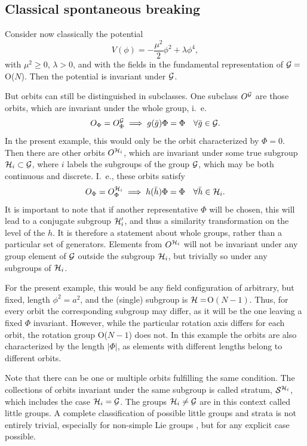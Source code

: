 \documentclass[final,twoside,12pt]{article}
\newcommand*{\no}{\noindent}
\newcommand*{\be}{\begin{equation}}
\newcommand*{\ee}{\end{equation}}
\newcommand*{\nn}{\nonumber}
\newcommand*{\1}{1\!\!\!\bot}
\begin{document}
\subsection{Classical spontaneous breaking}\label{ss:cssb}

Consider now classically the potential
\be
V(\phi)=-\frac{\mu^2}{2}\phi^2+\lambda\phi^4\label{esb:pot},
\ee
\no with $\mu^2\ge0$, $\lambda>0$, and with the fields in the fundamental representation of ${\cal G}=$O($N$). Then the potential is invariant under ${\cal G}$.

But orbits can still be distinguished in subclasses. One subclass $O^{\cal G}$ are those orbits, which are invariant under the whole group, i.\ e.\
\be
O_\Phi=O_\Phi^{\cal G}\implies g(\bar{g})\Phi=\Phi\quad\forall \bar{g}\in{\cal G}\nn.
\ee
\no In the present example, this would only be the orbit characterized by $\Phi=0$. Then there are other orbits $O^{{\cal H}_i}$, which are invariant under some true subgroup ${\cal H}_i\subset{\cal G}$, where $i$ labels the subgroups of the group ${\cal G}$, which may be both continuous and discrete. I.\ e., these orbits satisfy
\be
O_\Phi=O_\Phi^{{\cal H}_i}\implies h(\bar{h})\Phi=\Phi\quad\forall \bar{h}\in{\cal H}_i\nn.
\ee
\no  It is important to note that if another representative $\Phi$ will be chosen, this will lead to a conjugate subgroup ${\cal H}_i'$, and thus a similarity transformation on the level of the $h$. It is therefore a statement about whole groups, rather than a particular set of generators. Elements from $O^{{\cal H}_i}$ will not be invariant under any group element of ${\cal G}$ outside the subgroup ${\cal H}_i$, but trivially so under any subgroups of ${\cal H}_i$.

For the present example, this would be any field configuration of arbitrary, but fixed, length $\phi^2=a^2$, and the (single) subgroup is ${\cal H}=$O$(N-1)$. Thus, for every orbit the corresponding subgroup may differ, as it will be the one leaving a fixed $\Phi$ invariant. However, while the particular rotation axis differs for each orbit, the rotation group O($N-1$) does not. In this example the orbits are also characterized by the length $|\Phi|$, as elements with different lengths belong to different orbits.

Note that there can be one or multiple orbits fulfilling the same condition. The collections of orbits invariant under the same subgroup is called stratum, ${\cal S}^{{\cal H}_i}$, which includes the case ${\cal H}_i={\cal G}$. The groups ${\cal H}_i\neq{\cal G}$ are in this context called little groups. A complete classification of possible little groups and strata is not entirely trivial, especially for non-simple Lie groups \cite{O'Raifeartaigh:1978kv}, but for any explicit case possible.
\end{document}
